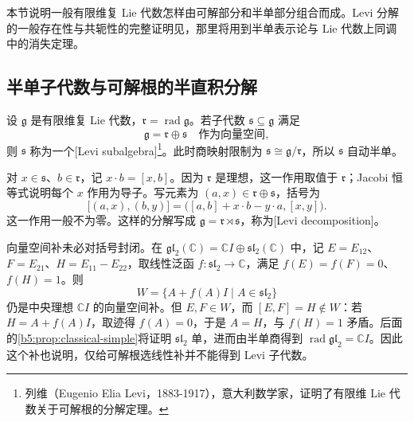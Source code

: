 

%
%
%

本节说明一般有限维复 Lie 代数怎样由可解部分和半单部分组合而成。Levi 分解的一般存在性与共轭性的完整证明见，那里将用到半单表示论与 Lie 代数上同调中的消失定理。

\subsection{半单子代数与可解根的半直积分解}
\label{b5:subsec:1204:01}

\begin{definition}\label{b5:def:levi-subalgebra}
	设 \(\mathfrak g\) 是有限维复 Lie 代数，\(\mathfrak r=\operatorname{rad}\mathfrak g\)。若子代数 \(\mathfrak s\subseteq\mathfrak g\) 满足
	\[
		\mathfrak g=\mathfrak r\oplus\mathfrak s \quad\text{作为向量空间},
	\]
	则 \(\mathfrak s\) 称为一个[Levi subalgebra]\footnote{列维（Eugenio Elia Levi，1883-1917），意大利数学家，证明了有限维 Lie 代数关于可解根的分解定理。}。此时商映射限制为 \(\mathfrak s\cong\mathfrak g/\mathfrak r\)，所以 \(\mathfrak s\) 自动半单。
\end{definition}

对 \(x\in\mathfrak s\)、\(b\in\mathfrak r\)，记 \(x\cdot b=[x,b]\)。因为 \(\mathfrak r\) 是理想，这一作用取值于 \(\mathfrak r\)；Jacobi 恒等式说明每个 \(x\) 作用为导子。写元素为 \((a,x)\in\mathfrak r\oplus\mathfrak s\)，括号为
\[
	\bigl[(a,x),(b,y)\bigr] =\bigl([a,b]+x\cdot b-y\cdot a,[x,y]\bigr).
\]
这一作用一般不为零。这样的分解写成 \(\mathfrak g=\mathfrak r\rtimes\mathfrak s\)，称为[Levi decomposition]。

\begin{example}\label{b5:exm:linear-complement-not-lie}
	向量空间补未必对括号封闭。在 \(\mathfrak{gl}_2(\mathbb C)=\mathbb CI\oplus\mathfrak{sl}_2(\mathbb C)\) 中，记 \(E=E_{12}\)、\(F=E_{21}\)、\(H=E_{11}-E_{22}\)，取线性泛函 \(f:\mathfrak{sl}_2\rightarrow\mathbb C\)，满足 \(f(E)=f(F)=0\)、\(f(H)=1\)。则
	\[
		W=\{A+f(A)I\mid A\in\mathfrak{sl}_2\}
	\]
	仍是中央理想 \(\mathbb CI\) 的向量空间补。但 \(E,F\in W\)，而 \([E,F]=H\notin W\)：若 \(H=A+f(A)I\)，取迹得 \(f(A)=0\)，于是 \(A=H\)，与 \(f(H)=1\) 矛盾。后面的\cref{b5:prop:classical-simple}将证明 \(\mathfrak{sl}_2\) 单，进而由半单商得到 \(\operatorname{rad}\mathfrak{gl}_2=\mathbb CI\)。因此这个补也说明，仅给可解根选线性补并不能得到 Levi 子代数。
\end{example}

